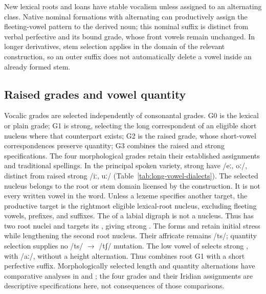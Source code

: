New lexical roots and loans have stable vocalism unless assigned to an
alternating class. Native nominal formations with alternating  can
productively assign the fleeting-vowel pattern to the derived noun; this nominal
suffix is distinct from verbal perfective  and its bound
 grade, whose front vowels remain unchanged. In longer derivatives,
stem selection applies in the domain of the relevant construction, so an outer
suffix does not automatically delete a vowel inside an already formed stem.

\subsection{Raised grades and vowel quantity}\label{sec:vowel-raising}

Vocalic grades are selected independently of consonantal grades.
G0 is the lexical or plain grade; G1 is strong, selecting the long
correspondent of an eligible short nucleus where that counterpart exists;
G2 is the raised grade, whose
short-vowel correspondences preserve quantity; G3 combines the raised and
strong specifications. The four morphological grades retain their
established assignments and traditional spellings. In the principal spoken
variety, strong  have /eː, oː/, distinct from raised strong
 /iː, uː/ (Table~\ref{tab:long-vowel-dialects}). The selected nucleus belongs
to the root or stem domain licensed by the construction. It is not every
written vowel in the word. Unless a lexeme specifies another target, the
productive target is the rightmost eligible lexical-root nucleus, excluding
fleeting vowels, prefixes, and suffixes. The  of a labial
digraph is not a nucleus. Thus   has two root nuclei and
targets its , giving strong . The forms
 and
 retain initial stress
while lengthening the second root nucleus. Their affricate remains /ts/;
quantity selection supplies no /ts/ $\rightarrow$ /tʃ/ mutation.
The low vowel of  selects strong , with /aː/,
without a height alternation. Thus
 combines root G1 with a short
perfective suffix.
Morphologically selected length and quantity alternations have comparative
analyses in \cite{quantity2023zimmermann} and
\cite{zimmermanntrommer2013}; the four grades and their Iridian assignments
are descriptive specifications here, not consequences of those comparisons.


